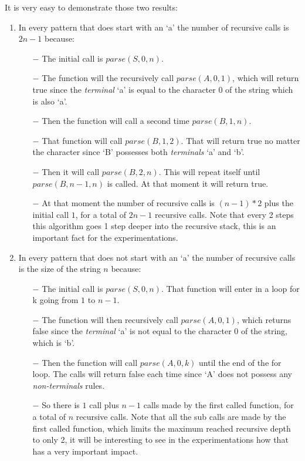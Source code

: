 It is very easy to demonstrate those two results:
\begin{enumerate}
    \item In every pattern that does start with an `a' the number of recursive calls is $2n - 1$ because:
        \begin{itemize}
            \item[$-$] The initial call is $parse(S, 0, n)$.
            \item[$-$] The function will the recursively call $parse(A, 0, 1)$, which will return true since the \textit{terminal} `a' is equal to the character 0 of the string which is also `a'.
            \item[$-$] Then the function will call a second time $parse(B, 1, n)$.
            \item[$-$] That function will call $parse(B, 1, 2)$. That will return true no matter the character since `B' possesses both \textit{terminals} `a' and `b'.
            \item[$-$] Then it will call $parse(B, 2, n)$. This will repeat itself until $parse(B, n - 1, n)$ is called. At that moment it will return true.
            \item[$-$] At that moment the number of recursive calls is $(n - 1) * 2$ plus the initial call $1$, for a total of $2n - 1$ recursive calls. Note that every 2 steps this algorithm goes 1 step deeper into the recursive stack, this is an important fact for the experimentations.
        \end{itemize}
    \item In every pattern that does not start with an `a' the number of recursive calls is the size of the string $n$ because:
        \begin{itemize}
            \item[$-$] The initial call is $parse(S, 0, n)$. That function will enter in a loop for k going from $1$ to $n - 1$.
            \item[$-$] The function will then recursively call $parse(A, 0, 1)$, which returns false since the \textit{terminal} `a' is not equal to the character 0 of the string, which is `b'.
            \item[$-$] Then the function will call $parse(A, 0, k)$ until the end of the for loop. The calls will return false each time since `A' does not possess any \textit{non-terminals} rules.
            \item[$-$] So there is $1$ call plus $n - 1$ calls made by the first called function, for a total of $n$ recursive calls. Note that all the sub calls are made by the first called function, which limits the maximum reached recursive depth to only 2, it will be interesting to see in the experimentations how that has a very important impact.
        \end{itemize}
\end{enumerate}

